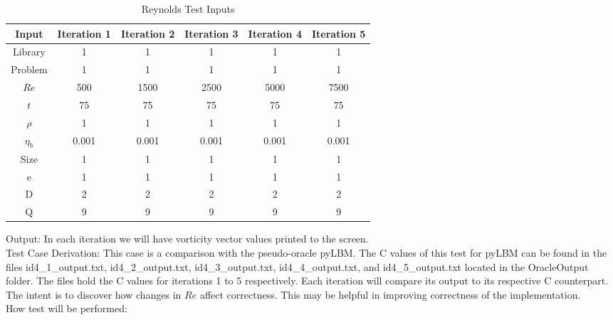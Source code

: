 \documentclass[12pt, titlepage]{article}
\begin{document}
\begin{enumerate}
\begin{table}[!h]
	\begin{center}
		\begin{tabular}{| c | c | c | c | c | c |}
			\hline
			Input & Iteration 1 & Iteration 2 & Iteration 3 & Iteration 4 & Iteration 5 \\
			\hline
			Library& 1 & 1& 1&1&1\\
			\hline
			Problem&1 &1 &1 &1 &1\\
			\hline
			$Re$ & 500 & 1500 & 2500 & 5000 & 7500 \\
			\hline
			$t$ & 75& 75& 75& 75& 75\\
			\hline
			$\rho$ & 1& 1& 1& 1& 1\\
			\hline
			$\eta_b$ & 0.001& 0.001& 0.001& 0.001& 0.001\\
			\hline
			Size & 1& 1& 1& 1& 1\\
			\hline
			$\mathrm{e}$ & 1& 1& 1& 1& 1\\
			\hline
			$\mathrm{D}$ & 2& 2& 2& 2& 2\\
			\hline
			$\mathrm{Q}$ & 9& 9& 9& 9& 9\\
			\hline
		\end{tabular}
		\caption{Reynolds Test Inputs}
	\end{center}
\end{table} 

Output: In each iteration we will have vorticity vector values printed to the screen.\\

Test Case Derivation: This case is a comparison with the pseudo-oracle
pyLBM. The C values of this test for pyLBM can be found in the files
id4\_1\_output.txt, id4\_2\_output.txt, id4\_3\_output.txt, id4\_4\_output.txt, and id4\_5\_output.txt located in the OracleOutput folder. The files hold the C values for iterations 1 to 5 respectively. Each iteration will compare its output to its respective C counterpart. The intent is to discover how changes in $Re$ affect correctness. This may be helpful in improving correctness of the implementation.\\

How test will be performed: 


\end{enumerate}
\end{document}
